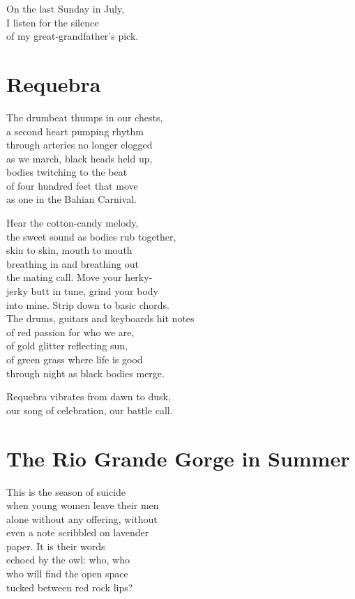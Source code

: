 \documentclass[twoside,10pt]{book}
\begin{document}
On the last Sunday in July,\\
I listen for the silence\\
of my great-grandfather's pick.


\clearpage
\section{Requebra}

The drumbeat thumps in our chests,\\
a second heart pumping rhythm\\
through arteries no longer clogged\\
as we march, black heads held up,\\
bodies twitching to the beat\\
of four hundred feet that move\\
as one in the Bahian Carnival.

Hear the cotton-candy melody,\\
the sweet sound as bodies rub together,\\
skin to skin, mouth to mouth\\
breathing in and breathing out\\
the mating call. Move your herky-\\
jerky butt in tune, grind your body\\
into mine. Strip down to basic chords.\\
The drums, guitars and keyboards hit notes\\
of red passion for who we are,\\
of gold glitter reflecting sun,\\
of green grass where life is good\\
through night as black bodies merge.

Requebra vibrates from dawn to dusk,\\
our song of celebration, our battle call.


\clearpage
\section{The Rio Grande Gorge in Summer}

This is the season of suicide\\
when young women leave their men\\
alone without any offering, without\\
even a note scribbled on lavender\\
paper. It is their words\\
echoed by the owl: who, who\\
who will find the open space\\
tucked between red rock lips?
\end{document}
